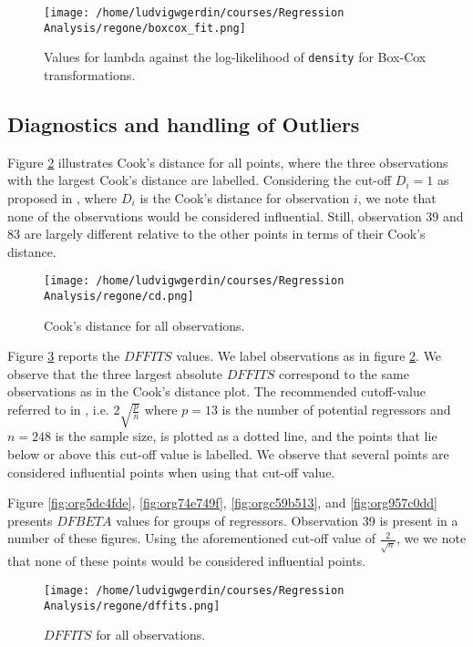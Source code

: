 \documentclass[11pt]{article}
\begin{document}
\begin{figure}[h]
\centering
\texttt{[image: /home/ludvigwgerdin/courses/Regression Analysis/regone/boxcox\_fit.png]}
\caption{\label{fig:orgf64de7c}
Values for lambda against the log-likelihood of \texttt{density} for Box-Cox transformations.}
\end{figure}

\subsection{Diagnostics and handling of Outliers}
\label{sec:orgad2643b}

Figure \ref{fig:orgccf3430} illustrates Cook's distance for all points, where the three observations with the largest 
Cook's distance are labelled. Considering the cut-off \(D_i = 1\) as proposed in \cite{Montgomery2012}, 
where \(D_i\) is the Cook's distance for observation \(i\), we note that none of the observations would be 
considered influential. Still, observation 39 and 83 are largely different relative
to the other points in terms of their Cook's distance. 

\begin{figure}[h]
\centering
\texttt{[image: /home/ludvigwgerdin/courses/Regression Analysis/regone/cd.png]}
\caption{\label{fig:orgccf3430}
Cook's distance for all observations.}
\end{figure}

Figure \ref{fig:org6a5ddc6} reports the \(DFFITS\) values. We label observations as in figure \ref{fig:orgccf3430}. We observe 
that the three largest absolute \(DFFITS\) correspond to the same observations as in the Cook's distance plot.
The recommended cutoff-value referred to in \cite{Montgomery2012}, i.e. \(2\sqrt{\frac{p}{n}}\)
where \(p = 13\) is the number of potential regressors and \(n = 248\) is the sample size, is 
plotted as a dotted line, and the points that lie below or above this cut-off value is labelled.
We observe that several points are considered influential points when using that cut-off value.

Figure \ref{fig:org5dc4fde}, \ref{fig:org74e749f}, \ref{fig:orgc59b513}, and
\ref{fig:org957c0dd} presents \(DFBETA\) values for groups of regressors. Observation 39
is present in a number of these figures. Using the aforementioned cut-off value of \(\frac{2}{\sqrt{n}}\), we 
we note that none of these points would be considered influential points.
\begin{figure}[h]
\centering
\texttt{[image: /home/ludvigwgerdin/courses/Regression Analysis/regone/dffits.png]}
\caption{\label{fig:org6a5ddc6}
\(DFFITS\) for all observations.}
\end{figure}
\end{document}
